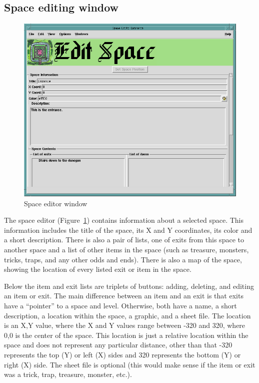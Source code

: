 \subsection{Space editing window}
\label{sect:spaceedit}

\begin{figure}[hbpt] 
\begin{centering}
\includegraphics[width=5in]{SpaceEditor.png}
\caption{Space editor window}
\label{fig:SpaceEditor}
\end{centering}
\end{figure}
The space editor (Figure~\ref{fig:SpaceEditor}) contains information
about a selected space.  This information includes the title of the
space, its X and Y coordinates, its color and a short description. 
There is also a pair of lists, one of exits from this space to another
space and a list of other items in the space (such as treasure,
monsters, tricks, traps, and any other odds and ends).  There is also a
map of the space, showing the location of every listed exit or item in
the space.

Below the item and exit lists are triplets of buttons: adding,
deleting, and editing an item or exit.  The main difference between an
item and an exit is that exits have a ``pointer'' to a space and level.
Otherwise, both have a name, a short description, a location within
the space, a graphic, and a sheet file.  The location is an X,Y value,
where the  X and Y values range between -320 and 320, where 0,0 is the
center of the space.  This location is just a relative location within
the space and does not represent any particular distance, other than
that -320 represents the top (Y) or left (X) sides and 320 represents
the bottom (Y) or right (X) side.  The sheet file is optional (this
would make sense if the item or exit was a trick, trap, treasure,
monster, etc.).

